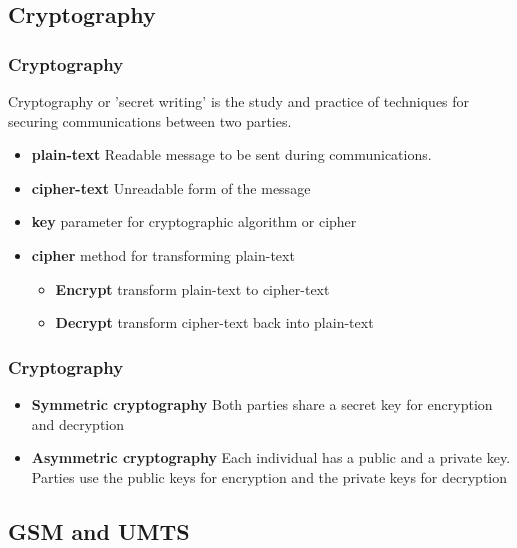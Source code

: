 \documentclass{beamer}
\begin{document}
\subsection{Cryptography}
	\begin{frame}
	\frametitle{Cryptography}
	
		Cryptography or 'secret writing' is the study and practice of techniques for securing communications between two parties. \linebreak
		\begin{itemize}
			\item \textbf{plain-text}  Readable message to be sent during communications.
			\item \textbf{cipher-text} Unreadable form of the message
			\item \textbf{key} parameter for cryptographic algorithm or cipher		
			\item \textbf{cipher} method for transforming plain-text
			\begin{itemize}
				\item \textbf{Encrypt} transform plain-text to cipher-text
				\item \textbf{Decrypt} transform cipher-text back into plain-text
				
				
			\end{itemize}
	        		
			
		\end{itemize}		 
	
	\end{frame}
	\begin{frame}
	\frametitle{Cryptography}
		\begin{itemize}
			\item \textbf{Symmetric cryptography} 
			Both parties share a secret key for encryption and decryption
			\item \textbf{Asymmetric cryptography}
			Each individual has a public and a private key. Parties use the public keys for encryption and the private keys for decryption
		\end{itemize}
	
	\end{frame}
\subsection{GSM and UMTS}
	
\end{document}
